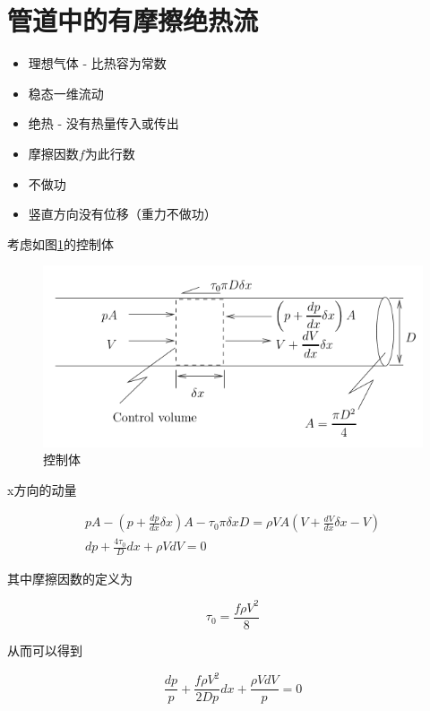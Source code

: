 \section{管道中的有摩擦绝热流}

\begin{itemize}
    \item 理想气体 - 比热容为常数
    \item 稳态一维流动
    \item 绝热 - 没有热量传入或传出
    \item 摩擦因数$f$为此行数
    \item 不做功
    \item 竖直方向没有位移（重力不做功）
\end{itemize}

考虑如图\ref{24}的控制体

\begin{figure}[!ht]
    \centering
    \includegraphics[width=\linewidth]{figures/24.png}
    \caption{控制体}
    \label{24}
\end{figure}

x方向的动量

\begin{gather*}
    p A-\left(p+\frac{d p}{d x} \delta x\right) A-\tau_{0} \pi \delta x D=\rho V A\left(V+\frac{d V}{d x} \delta x-V\right)\\ 
    d p+\frac{4 \tau_{0}}{D} d x+\rho V d V=0
\end{gather*}

其中摩擦因数的定义为

\begin{equation*}
    \tau_{0}=\frac{f \rho V^{2}}{8}
\end{equation*}


从而可以得到

\begin{equation*}
    \frac{d p}{p}+\frac{f \rho V^{2}}{2 D p} d x+\frac{\rho V d V}{p}=0
\end{equation*}


